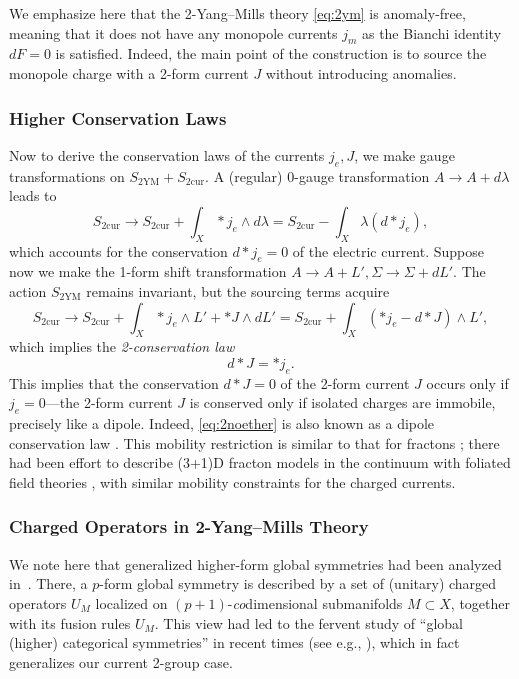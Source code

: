 \documentclass[onecolumn]{article}
\theoremstyle{theorem}
\theoremstyle{remark}
\theoremstyle{example}
\theoremstyle{definition}
\numberwithin{equation}{section}
\begin{document}
We emphasize here that the 2-Yang--Mills theory  \eqref{eq:2ym} is anomaly-free, meaning that it does not have any monopole currents $j_m$ as the Bianchi identity $dF=0$ is satisfied. Indeed, the main point of the construction is to source the monopole charge with a 2-form current $J$ { {without}} introducing anomalies.

\subsubsection{Higher Conservation Laws}
Now to derive the conservation laws of the currents $j_e,J$, we make gauge transformations on $S_\text{2YM}+S_\text{2cur}$. A (regular) 0-gauge transformation $A\rightarrow A+d\lambda$ leads to
\begin{equation}
    S_\text{2cur}\rightarrow S_\text{2cur} + \int_X \ast j_e\wedge d\lambda =S_\text{2cur} -\int_X \lambda (d\ast j_e),\nonumber
\end{equation}
which accounts for the conservation $d\ast j_e=0$ of the { {electric}} current. Suppose now we make the 1-form shift transformation $A\rightarrow A+L',\Sigma\rightarrow \Sigma + dL'$. The action $S_\text{2YM}$ remains invariant, but the sourcing terms acquire
\begin{equation}
    S_\text{2cur}\rightarrow S_\text{2cur}+\int_X \ast j_e \wedge L' + \ast J \wedge dL' = S_\text{2cur}+\int_X (\ast j_e - d\ast J) \wedge L',\nonumber
\end{equation}
which implies the {\it {2-conservation law}}
\begin{equation}
    d\ast J = \ast j_e.\label{eq:2noether}
\end{equation}
{This} implies that the conservation $d\ast J=0$ of the 2-form current $J$ occurs only if $j_e=0$---the 2-form current $J$ is conserved only if { {isolated charges are immobile}}, precisely like a dipole. Indeed,  \eqref{eq:2noether} is also known as a {{dipole}} conservation law \cite{Dubinkin:2020kxo}. This mobility restriction is similar to that for fractons \cite{Pretko:2017fbf,Slagle.96.195139}; there had been effort to describe (3+1)D fracton models in the continuum with { {foliated}} field theories \cite{Pretko:2020}, with similar mobility constraints for the charged currents.

\subsubsection{Charged Operators in 2-Yang--Mills Theory}\label{2ymoperators}
    We note here that generalized higher-form global symmetries had been analyzed in~\cite{Gaiotto:2014kfa}. There, a $p$-form global symmetry is described by a set of (unitary) charged operators $U_M$ localized on $(p+1)$-\textit{co}dimensional submanifolds $M\subset X$, together with its fusion rules $U_M$. This view had led to the fervent study of ``global (higher) categorical symmetries'' in recent times (see e.g., \cite{Wen:2019,Kong:2020}), which in fact generalizes our current 2-group case.
    
\end{document}
